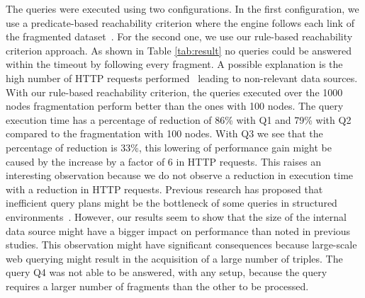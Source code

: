 The queries were executed using two configurations.
In the first configuration, we use a predicate-based reachability criterion where the engine follows each link of the fragmented dataset~.
For the second one, we use our rule-based reachability criterion approach.
As shown in Table \ref{tab:result} no queries could be answered within the timeout by following every fragment.
A possible explanation is the high number of HTTP requests performed~\cite{Hartig2016} leading to non-relevant data sources. 
With our rule-based reachability criterion, the queries executed over the 1000 nodes fragmentation perform better than the ones with 100 nodes.
The query execution time has a percentage of reduction of 86\% with Q1 and 79\% with Q2 compared to the fragmentation with 100 nodes.
With Q3 we see that the percentage of reduction is 33\%, this lowering of performance gain might be caused by the increase by a factor of 6 in HTTP requests.
This raises an interesting observation because we do not observe a reduction in execution time with a reduction in HTTP requests.
Previous research has proposed that inefficient query plans might be the bottleneck of some queries in structured environments~\cite{taelman2023,eschauzier_quweda_2023}.
However, our results seem to show that the size of the internal data source might have a bigger impact on performance than noted in previous studies.
This observation might have significant consequences because large-scale web querying might result in the acquisition of a large number of triples.
The query Q4 was not able to be answered, with any setup, because the query requires a larger number of fragments than the other to be processed.
